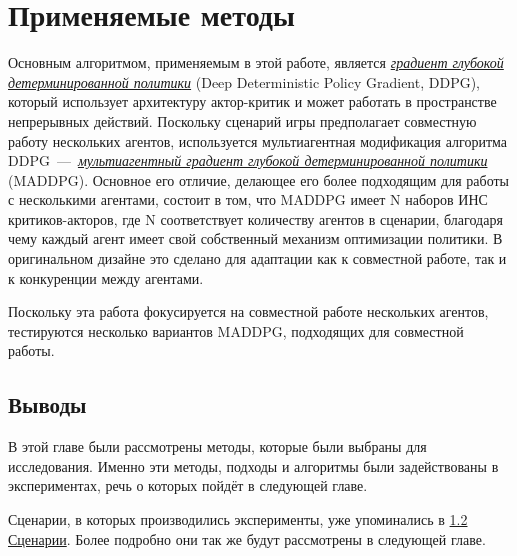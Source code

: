 \chapter{Применяемые методы} \label{ch3}

Основным алгоритмом, применяемым в этой работе, является \hyperref[acr:ddpg]{\textit{градиент глубокой детерминированной политики}} (Deep Deterministic Policy Gradient, DDPG), который использует архитектуру актор-критик и может работать в пространстве непрерывных действий. Поскольку сценарий игры предполагает совместную работу нескольких агентов, используется мультиагентная модификация алгоритма DDPG~---~\hyperref[acr:maddpg]{\textit{мультиагентный градиент глубокой детерминированной политики}} (MADDPG). Основное его отличие, делающее его более подходящим для работы с несколькими агентами, состоит в том, что MADDPG имеет N наборов ИНС критиков-акторов, где N соответствует количеству агентов в сценарии, благодаря чему каждый агент имеет свой собственный механизм оптимизации политики. В оригинальном дизайне \cite{lowe2017multiagent} это сделано для адаптации как к совместной работе, так и к конкуренции между агентами.

Поскольку эта работа фокусируется на совместной работе нескольких агентов, тестируются несколько вариантов MADDPG, подходящих для совместной работы.





\section{Выводы}

В этой главе были рассмотрены методы, которые были выбраны для исследования. Именно эти методы, подходы и алгоритмы были задействованы в экспериментах, речь о которых пойдёт в следующей главе. 

Сценарии, в которых производились эксперименты, уже упоминались в \hyperref[intro:sec2]{1.2 Сценарии}. Более подробно они так же будут рассмотрены в следующей главе.

\newpage

